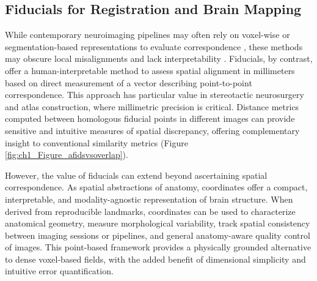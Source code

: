 \subsection{Fiducials for Registration and Brain Mapping}
While contemporary neuroimaging pipelines may often rely on voxel-wise or segmentation-based representations to evaluate correspondence \cite{Chakravarty2008-mt,Hoffmann2024-yd}, these methods may obscure local misalignments \cite{Lau2019-eh} and lack interpretability \cite{Rohlfing2012-kt}. Fiducials, by contrast, offer a human-interpretable method to assess spatial alignment in millimeters based on direct measurement of a vector describing point-to-point correspondence. This approach has particular value in stereotactic neurosurgery and atlas construction, where millimetric precision is critical. Distance metrics computed between homologous fiducial points in different images can provide sensitive and intuitive measures of spatial discrepancy, offering complementary insight to conventional similarity metrics (Figure \ref{fig:ch1_Figure_afidsvsoverlap}).

However, the value of fiducials can extend beyond ascertaining spatial correspondence. As spatial abstractions of anatomy, coordinates offer a compact, interpretable, and modality-agnostic representation of brain structure. When derived from reproducible landmarks, coordinates can be used to characterize anatomical geometry, measure morphological variability, track spatial consistency between imaging sessions or pipelines, and general anatomy-aware quality control of images. This point-based framework provides a physically grounded alternative to dense voxel-based fields, with the added benefit of dimensional simplicity and intuitive error quantification.


